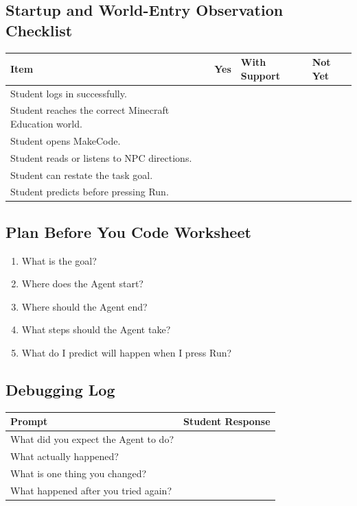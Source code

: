 \documentclass[12pt]{article}
\begin{document}
\subsection{Startup and World-Entry Observation Checklist}

\begin{xltabular}{\textwidth}{|L|P{0.75in}|P{0.95in}|P{0.85in}|}
\hline
{}\color{white}\bfseries Item & \color{white}\bfseries Yes & \color{white}\bfseries With Support & \color{white}\bfseries Not Yet \\
\hline
Student logs in successfully. & & & \\
\hline
Student reaches the correct Minecraft Education world. & & & \\
\hline
Student opens MakeCode. & & & \\
\hline
Student reads or listens to NPC directions. & & & \\
\hline
Student can restate the task goal. & & & \\
\hline
Student predicts before pressing Run. & & & \\
\hline
\end{xltabular}

\subsection{Plan Before You Code Worksheet}

\begin{enumerate}
\item What is the goal?
\item Where does the Agent start?
\item Where should the Agent end?
\item What steps should the Agent take?
\item What do I predict will happen when I press Run?
\end{enumerate}

\subsection{Debugging Log}

\begin{xltabular}{\textwidth}{|P{2.4in}|L|}
\hline
{}\color{white}\bfseries Prompt & \color{white}\bfseries Student Response \\
\hline
What did you expect the Agent to do? & \\
\hline
What actually happened? & \\
\hline
What is one thing you changed? & \\
\hline
What happened after you tried again? & \\
\hline
\end{xltabular}
\end{document}
